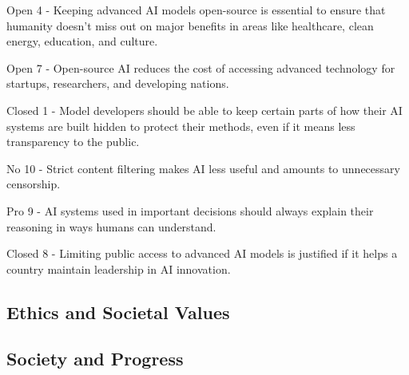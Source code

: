 Open 4 - Keeping advanced AI models open-source is essential to ensure that humanity doesn't miss out on major benefits in areas like healthcare, clean energy, education, and culture.
\citep{latif_agi_2024}
\citep{european_commission_impact_2022}
\citep{gruetzemacher_transformative_2021}


Open 7 - Open-source AI reduces the cost of accessing advanced technology for startups, researchers, and developing nations.
\citep{jones_nonrivalry_2020}

Closed 1 - Model developers should be able to keep certain parts of how their AI systems are built hidden to protect their methods, even if it means less transparency to the public.
\citep{touvron_llama_2023}
\citep{eiras_near_2024}

No 10 - Strict content filtering makes AI less useful and amounts to unnecessary censorship.
\citep{perrigo_elon_2023}

Pro 9 - AI systems used in important decisions should always explain their reasoning in ways humans can understand.
\citep{askell_general_2021}
\citep{meng_locating_2023}

Closed 8 - Limiting public access to advanced AI models is justified if it helps a country maintain leadership in AI innovation.
\citep{whitehouse_removing_2025}

\subsection{Ethics and Societal Values}

\subsection{Society and Progress}

